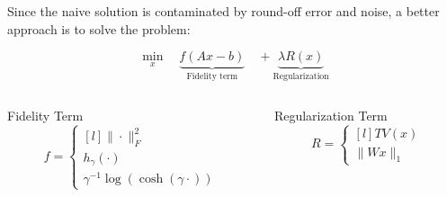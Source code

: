 \documentclass[12pt]{beamer}
\begin{document}
\begin{frame}
Since the naive solution is contaminated by round-off error and noise, a better approach is to solve the problem:
\begin{block}{}
\[ \min_x \quad \underbrace{f(Ax-b)}_{\text{Fidelity term}}  \quad + \underbrace{\lambda R(x)}_{\text{Regularization}} \]
\end{block}

\begin{columns}[T]
	\begin{column}{0.45\linewidth}
		\begin{block}{Fidelity Term} \vspace{-2.5ex}
			\[ f = \left\{ \begin{matrix*}[l] 
			\| \cdot \|_F^2 \\[1ex] h_{\gamma}( \cdot ) \\[1ex] \gamma^{-1} \log(\cosh(\gamma \cdot)) 
			\end{matrix*} \right. \]
		\end{block}
	\end{column}
	\begin{column}{0.45\linewidth}
		\begin{block}{Regularization Term}
			\[ R = \left\{ \begin{matrix*}[l]
			TV(x) \\[1ex] \| Wx \|_1
			\end{matrix*} \right. \]
		\end{block}
	\end{column}
\end{columns}
\end{frame}

%
%
%
%
\end{document}
